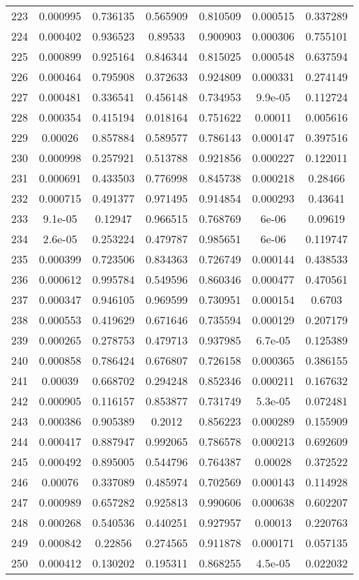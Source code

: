\begin{table}
\begin{tabular}{c|c|c|c|c|c|c}
223 & 0.000995 & 0.736135 & 0.565909 & 0.810509 & 0.000515 & 0.337289\\
224 & 0.000402 & 0.936523 & 0.89533 & 0.900903 & 0.000306 & 0.755101\\
225 & 0.000899 & 0.925164 & 0.846344 & 0.815025 & 0.000548 & 0.637594\\
226 & 0.000464 & 0.795908 & 0.372633 & 0.924809 & 0.000331 & 0.274149\\
227 & 0.000481 & 0.336541 & 0.456148 & 0.734953 & 9.9e-05 & 0.112724\\
228 & 0.000354 & 0.415194 & 0.018164 & 0.751622 & 0.00011 & 0.005616\\
229 & 0.00026 & 0.857884 & 0.589577 & 0.786143 & 0.000147 & 0.397516\\
230 & 0.000998 & 0.257921 & 0.513788 & 0.921856 & 0.000227 & 0.122011\\
231 & 0.000691 & 0.433503 & 0.776998 & 0.845738 & 0.000218 & 0.28466\\
232 & 0.000715 & 0.491377 & 0.971495 & 0.914854 & 0.000293 & 0.43641\\
233 & 9.1e-05 & 0.12947 & 0.966515 & 0.768769 & 6e-06 & 0.09619\\
234 & 2.6e-05 & 0.253224 & 0.479787 & 0.985651 & 6e-06 & 0.119747\\
235 & 0.000399 & 0.723506 & 0.834363 & 0.726749 & 0.000144 & 0.438533\\
236 & 0.000612 & 0.995784 & 0.549596 & 0.860346 & 0.000477 & 0.470561\\
237 & 0.000347 & 0.946105 & 0.969599 & 0.730951 & 0.000154 & 0.6703\\
238 & 0.000553 & 0.419629 & 0.671646 & 0.735594 & 0.000129 & 0.207179\\
239 & 0.000265 & 0.278753 & 0.479713 & 0.937985 & 6.7e-05 & 0.125389\\
240 & 0.000858 & 0.786424 & 0.676807 & 0.726158 & 0.000365 & 0.386155\\
241 & 0.00039 & 0.668702 & 0.294248 & 0.852346 & 0.000211 & 0.167632\\
242 & 0.000905 & 0.116157 & 0.853877 & 0.731749 & 5.3e-05 & 0.072481\\
243 & 0.000386 & 0.905389 & 0.2012 & 0.856223 & 0.000289 & 0.155909\\
244 & 0.000417 & 0.887947 & 0.992065 & 0.786578 & 0.000213 & 0.692609\\
245 & 0.000492 & 0.895005 & 0.544796 & 0.764387 & 0.00028 & 0.372522\\
246 & 0.00076 & 0.337089 & 0.485974 & 0.702569 & 0.000143 & 0.114928\\
247 & 0.000989 & 0.657282 & 0.925813 & 0.990606 & 0.000638 & 0.602207\\
248 & 0.000268 & 0.540536 & 0.440251 & 0.927957 & 0.00013 & 0.220763\\
249 & 0.000842 & 0.22856 & 0.274565 & 0.911878 & 0.000171 & 0.057135\\
250 & 0.000412 & 0.130202 & 0.195311 & 0.868255 & 4.5e-05 & 0.022032\\
\end{tabular}
\end{table}
